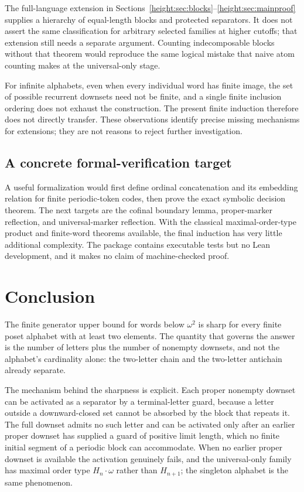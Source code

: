 \documentclass[11pt,a4paper]{article}
\numberwithin{equation}{section}
\theoremstyle{definition}
\theoremstyle{remark}
\newcommand{\Hn}[1]{H_{#1}}
\begin{document}
The full-language extension in Sections~\ref{height:sec:blocks}--\ref{height:sec:mainproof}
supplies a hierarchy of equal-length blocks and protected separators.
It does not assert the same classification for arbitrary selected families
at higher cutoffs; that extension still needs a separate argument. Counting indecomposable blocks without that theorem
would reproduce the same logical mistake that naive atom counting makes
at the universal-only stage.

For infinite alphabets, even when every individual word has finite image,
the set of possible recurrent downsets need not be finite, and a single
finite inclusion ordering does not exhaust the construction. The present
finite induction therefore does not directly transfer. These observations
identify precise missing mechanisms for extensions; they are not reasons
to reject further investigation.

\subsection{A concrete formal-verification target}
A useful formalization would first define ordinal concatenation and its
embedding relation for finite periodic-token codes, then prove the exact
symbolic decision theorem. The next targets are the cofinal boundary lemma,
proper-marker reflection, and universal-marker reflection. With the
classical maximal-order-type product and finite-word theorems available,
the final induction has very little additional complexity. The package
contains executable tests but no Lean development, and it makes no claim
of machine-checked proof.

\section{Conclusion}
\label{sec:conclusion}

The finite generator upper bound for words below $\omega^2$ is sharp for every
finite poset alphabet with at least two elements. The quantity that governs the
answer is the number of letters plus the number of nonempty downsets, and not
the alphabet's cardinality alone: the two-letter chain and the two-letter
antichain already separate.

The mechanism behind the sharpness is explicit. Each proper nonempty downset
can be activated as a separator by a terminal-letter guard, because a letter
outside a downward-closed set cannot be absorbed by the block that repeats it.
The full downset admits no such letter and can be activated only after an
earlier proper downset has supplied a guard of positive limit length, which no
finite initial segment of a periodic block can accommodate. When no earlier
proper downset is available the activation genuinely fails, and the
universal-only family has maximal order type $\Hn n\cdot\omega$ rather than
$\Hn{n+1}$; the singleton alphabet is the same phenomenon.
\end{document}
